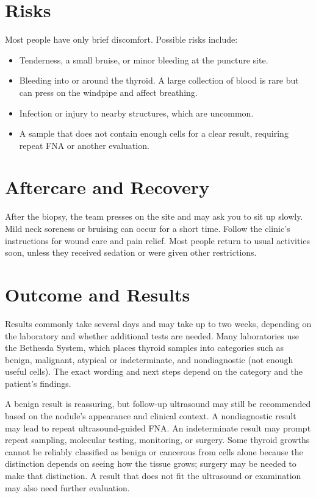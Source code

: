 \section*{Risks}
Most people have only brief discomfort. Possible risks include:
\begin{itemize}
    \item Tenderness, a small bruise, or minor bleeding at the puncture site.
    \item Bleeding into or around the thyroid. A large collection of blood is rare but can press on the windpipe and affect breathing.
    \item Infection or injury to nearby structures, which are uncommon.
    \item A sample that does not contain enough cells for a clear result, requiring repeat FNA or another evaluation.
\end{itemize}

\section*{Aftercare and Recovery}
After the biopsy, the team presses on the site and may ask you to sit up slowly. Mild neck soreness or bruising can occur for a short time. Follow the clinic's instructions for wound care and pain relief. Most people return to usual activities soon, unless they received sedation or were given other restrictions.

\section*{Outcome and Results}
Results commonly take several days and may take up to two weeks, depending on the laboratory and whether additional tests are needed. Many laboratories use the Bethesda System, which places thyroid samples into categories such as benign, malignant, atypical or indeterminate, and nondiagnostic (not enough useful cells). The exact wording and next steps depend on the category and the patient's findings.

A benign result is reassuring, but follow-up ultrasound may still be recommended based on the nodule's appearance and clinical context. A nondiagnostic result may lead to repeat ultrasound-guided FNA. An indeterminate result may prompt repeat sampling, molecular testing, monitoring, or surgery. Some thyroid growths cannot be reliably classified as benign or cancerous from cells alone because the distinction depends on seeing how the tissue grows; surgery may be needed to make that distinction. A result that does not fit the ultrasound or examination may also need further evaluation.

